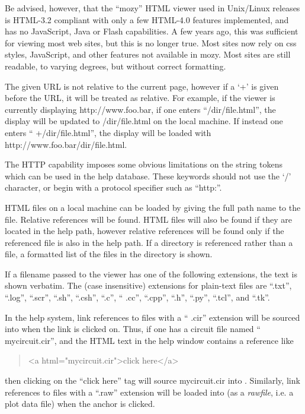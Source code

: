 Be advised, however, that the ``{\vt mozy}'' HTML viewer used in
Unix/Linux releases is HTML-3.2 compliant with only a few HTML-4.0
features implemented, and has no JavaScript, Java or Flash
capabilities.  A few years ago, this was sufficient for viewing most
web sites, but this is no longer true.  Most sites now rely on css
styles, JavaScript, and other features not available in {\vt mozy}. 
Most sites are still readable, to varying degrees, but without correct
formatting.

The given URL is not relative to the current page, however if a `+' is
given before the URL, it will be treated as relative.  For example, if
the viewer is currently displaying {\vt http://www.foo.bar}, if one
enters ``{\vt /dir/file.html}'', the display will be updated to {\vt
/dir/file.html} on the local machine.  If instead one enters ``{\vt
+/dir/file.html}'', the display will be loaded with {\vt
http://www.foo.bar/dir/file.html}.

The HTTP capability imposes some obvious limitations on the string
tokens which can be used in the help database.  These keywords should
not use the `/' character, or begin with a protocol specifier such as
``{\vt http:}''.

HTML files on a local machine can be loaded by giving the full path
name to the file.  Relative references will be found.  HTML files will
also be found if they are located in the help path, however relative
references will be found only if the referenced file is also in the
help path.  If a directory is referenced rather than a file, a
formatted list of the files in the directory is shown.

If a filename passed to the viewer has one of the following
extensions, the text is shown verbatim.  The (case insensitive)
extensions for plain-text files are ``{\vt .txt}'', ``{\vt .log}'',
``{\vt .scr}'', ``{\vt .sh}'', ``{\vt .csh}'', ``{\vt .c}'', ``{\vt
.cc}'', ``{\vt .cpp}'', ``{\vt .h}'', ``{\vt .py}'', ``{\vt .tcl}'',
and ``{\vt .tk}''.

In the {\WRspice} help system, link references to files with a ``{\vt
.cir}'' extension will be sourced into {\WRspice} when the link is
clicked on.  Thus, if one has a circuit file named ``{\vt
mycircuit.cir}'', and the HTML text in the help window contains a
reference like
\begin{quote}
{\vt <a html="mycircuit.cir">click here</a>}
\end{quote}
then clicking on the ``click here'' tag will source {\vt
mycircuit.cir} into {\WRspice}.  Similarly, link references to files
with a ``{\vt .raw}'' extension will be loaded into {\WRspice} (as a
{\it rawfile\/}, i.e. a plot data file) when the anchor is clicked.


